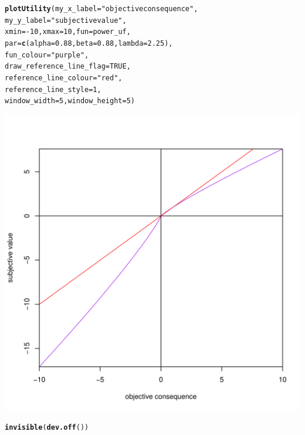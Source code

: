\documentclass{article}\usepackage[]{graphicx}\usepackage[]{color}
\makeatletter
\newcommand{\hlnum}[1]{\textcolor[rgb]{0.686,0.059,0.569}{#1}}%
\newcommand{\hlstr}[1]{\textcolor[rgb]{0.192,0.494,0.8}{#1}}%
\newcommand{\hlopt}[1]{\textcolor[rgb]{0,0,0}{#1}}%
\newcommand{\hlstd}[1]{\textcolor[rgb]{0.345,0.345,0.345}{#1}}%
\newcommand{\hlkwc}[1]{\textcolor[rgb]{0.333,0.667,0.333}{#1}}%
\newcommand{\hlkwd}[1]{\textcolor[rgb]{0.737,0.353,0.396}{\textbf{#1}}}%
\newenvironment{kframe}{%
 \def\at@end@of@kframe{}%
 \ifinner\ifhmode%
  \def\at@end@of@kframe{\end{minipage}}%
  \begin{minipage}{\columnwidth}%
 \fi\fi%
 \def\FrameCommand##1{\hskip\@totalleftmargin \hskip-\fboxsep
 \colorbox{shadecolor}{##1}\hskip-\fboxsep
     \hskip-\linewidth \hskip-\@totalleftmargin \hskip\columnwidth}%
 \MakeFramed {\advance\hsize-\width
   \@totalleftmargin\z@ \linewidth\hsize
   \@setminipage}}%
 {\par\unskip\endMakeFramed%
 \at@end@of@kframe}
\newenvironment{knitrout}{}{} %
\makeatother
\begin{document}
\begin{knitrout}
\color{fgcolor}\begin{kframe}
\begin{alltt}
\hlkwd{plotUtility}\hlstd{(}\hlkwc{my_x_label} \hlstd{=} \hlstr{"objective consequence"}\hlstd{,}
        \hlkwc{my_y_label} \hlstd{=} \hlstr{"subjective value"}\hlstd{,}
        \hlkwc{xmin} \hlstd{=} \hlopt{-}\hlnum{10}\hlstd{,} \hlkwc{xmax} \hlstd{=} \hlnum{10}\hlstd{,} \hlkwc{fun}\hlstd{=power_uf,}
        \hlkwc{par}\hlstd{=}\hlkwd{c}\hlstd{(}\hlkwc{alpha} \hlstd{=} \hlnum{0.88}\hlstd{,} \hlkwc{beta} \hlstd{=} \hlnum{0.88}\hlstd{,} \hlkwc{lambda} \hlstd{=} \hlnum{2.25}\hlstd{),}
        \hlkwc{fun_colour} \hlstd{=} \hlstr{"purple"}\hlstd{,}
        \hlkwc{draw_reference_line_flag} \hlstd{=} \hlnum{TRUE}\hlstd{,}
        \hlkwc{reference_line_colour} \hlstd{=} \hlstr{"red"}\hlstd{,}
        \hlkwc{reference_line_style} \hlstd{=} \hlnum{1}\hlstd{,}
        \hlkwc{window_width} \hlstd{=} \hlnum{5}\hlstd{,} \hlkwc{window_height} \hlstd{=} \hlnum{5}\hlstd{)}
\end{alltt}
\end{kframe}

{\centering \includegraphics[width=0.8\linewidth]{figure/unnamed-chunk-36} 

}


\begin{kframe}\begin{alltt}
\hlkwd{invisible}\hlstd{(}\hlkwd{dev.off}\hlstd{())}
\end{alltt}
\end{kframe}
\end{knitrout}
\end{document}
